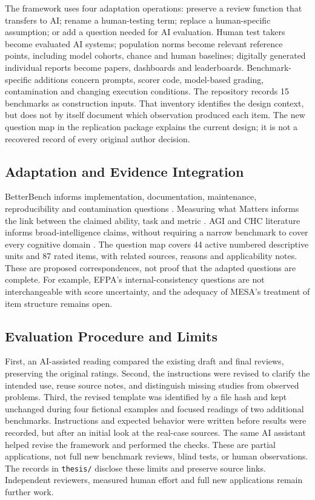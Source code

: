\documentclass[conference]{IEEEtran}
\begin{document}
        The framework uses four adaptation operations: preserve a review function that transfers to AI; rename a human-testing term; replace a human-specific assumption; or add a question needed for AI evaluation. Human test takers become evaluated AI systems; population norms become relevant reference points, including model cohorts, chance and human baselines; digitally generated individual reports become papers, dashboards and leaderboards. Benchmark-specific additions concern prompts, scorer code, model-based grading, contamination and changing execution conditions. The repository records 15 benchmarks as construction inputs. That inventory identifies the design context, but does not by itself document which observation produced each item. The new question map in the replication package explains the current design; it is not a recovered record of every original author decision.
    
    \subsection{Adaptation and Evidence Integration}

        BetterBench informs implementation, documentation, maintenance, reproducibility and contamination questions \cite{reuel_betterbench}. Measuring what Matters informs the link between the claimed ability, task and metric \cite{bean_measuring_what_matters}. AGI and CHC literature informs broad-intelligence claims, without requiring a narrow benchmark to cover every cognitive domain \cite{hendrycks_definition_agi}. The question map covers 44 active numbered descriptive units and 87 rated items, with related sources, reasons and applicability notes. These are proposed correspondences, not proof that the adapted questions are complete. For example, EFPA's internal-consistency questions are not interchangeable with score uncertainty, and the adequacy of MESA's treatment of item structure remains open.
    
    \subsection{Evaluation Procedure and Limits}
    
        First, an AI-assisted reading compared the existing draft and final reviews, preserving the original ratings. Second, the instructions were revised to clarify the intended use, reuse source notes, and distinguish missing studies from observed problems. Third, the revised template was identified by a file hash and kept unchanged during four fictional examples and focused readings of two additional benchmarks. Instructions and expected behavior were written before results were recorded, but after an initial look at the real-case sources. The same AI assistant helped revise the framework and performed the checks. These are partial applications, not full new benchmark reviews, blind tests, or human observations. The records in \texttt{thesis/} disclose these limits and preserve source links. Independent reviewers, measured human effort and full new applications remain further work.
    
\end{document}
